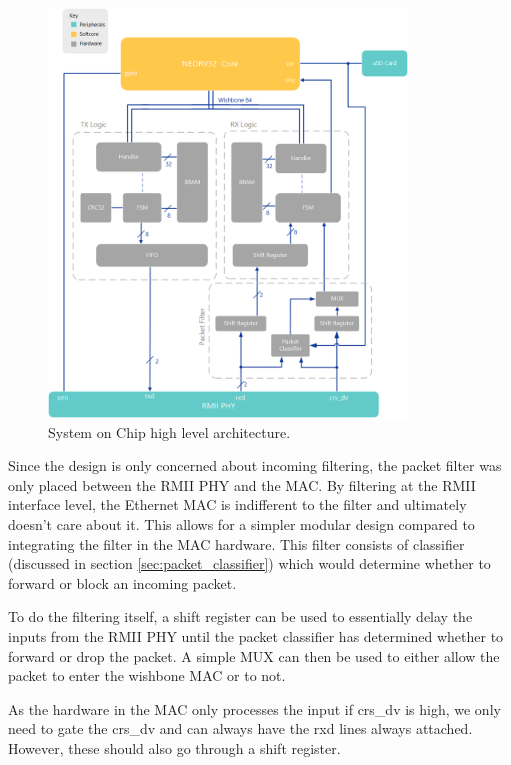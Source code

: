 \begin{figure}[h]
    \centering
    \includegraphics[width=0.85\textwidth]{Images/SoCArchitecture.png}
    \caption[System on Chip high level architecture]{System on Chip high level architecture.}
    \label{fig:soc_architecture}
\end{figure}

\newpage

Since the design is only concerned about incoming filtering, the packet filter was only placed between the RMII PHY and the MAC. By filtering at the RMII interface level, the Ethernet MAC is indifferent to the filter and ultimately doesn't care about it. This allows for a simpler modular design compared to integrating the filter in the MAC hardware. This filter consists of classifier (discussed in section \ref{sec:packet_classifier}) which would determine whether to forward or block an incoming packet.

To do the filtering itself, a shift register can be used to essentially delay the inputs from the RMII PHY until the packet classifier has determined whether to forward or drop the packet. A simple MUX can then be used to either allow the packet to enter the wishbone MAC or to not. 

As the hardware in the MAC only processes the input if crs\_dv is high, we only need to gate the crs\_dv and can always have the rxd lines always attached. However, these should also go through a shift register.

